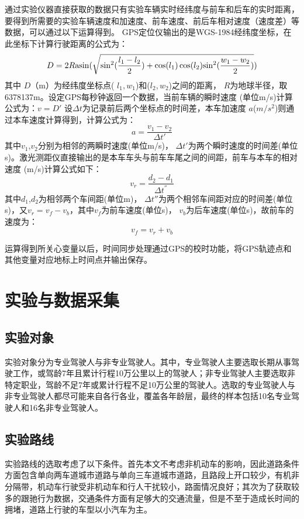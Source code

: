 通过实验仪器直接获取的数据只有实验车辆实时经纬度与前车和后车的实时距离，要得到所需要的实验车辆速度和加速度、前车速度、前后车相对速度（速度差）等数据，可以通过以下运算得到。
GPS定位仪输出的是WGS-1984经纬度坐标，在此坐标下计算行驶距离的公式为：
\begin{equation}
D = 2R{\rm{asin}}(\sqrt {\sin _{}^2(\frac{{{l_1} - {l_2}}}{2}) + \cos ({l_1})\cos ({l_2}){{\sin }^2}(\frac{{{w_1} - {w_2}}}{2})} )
\end{equation}
其中 $D$（m）为经纬度坐标点( ${l_1},{w_1}$)和(${l_2},{w_2}$)之间的距离， $R$为地球半径，取6378137m。设定GPS每秒钟返回一个数据，当前车辆的瞬时速度 (单位m/s)计算公式为：$v = D'$
设$\Delta t$为记录前后两个坐标点的时间差，本车加速度 $a$($m/s^2$)则通过本车速度计算得到，计算公式为：
\begin{equation}
a = \frac{{{v_1} - {v_2}}}{{\Delta t'}}
\end{equation}
其中$v_1$,$v_2$分别为相邻的两瞬时速度(单位m/s)， $\Delta {t'}$为两个瞬时速度的时间差(单位s)。激光测距仪直接输出的是本车车头与前车车尾之间的间距，前车与本车的相对速度 (m/s)计算公式如下：
\begin{equation}
{v_r} = \frac{{{d_2} - {d_1}}}{{\Delta {t^{''}}}}
\end{equation}
其中$d_1$,$d_2$为相邻两个车间距(单位m)， $\Delta t''$为两个相邻车间距对应的时间差(单位s)，又${v_r} = {v_f} - {v_b}$，其中${v_f}$为前车速度(单位s)， ${v_b}$为后车速度(单位s)，故前车的速度为：
\begin{equation}
{v_f} = {v_r} + {v_b}
\end{equation}

运算得到所关心变量以后，时间同步处理通过GPS的校时功能，将GPS轨迹点和其他变量对应地标上时间点并输出保存。

\section{实验与数据采集}
\subsection{实验对象}
实验对象分为专业驾驶人与非专业驾驶人。其中，专业驾驶人主要选取长期从事驾驶工作，或驾龄7年且累计行程10万公里以上的驾驶人；非专业驾驶人主要选取非特定职业，驾龄不足7年或累计行程不足10万公里的驾驶人。选取的专业驾驶人与非专业驾驶人都尽可能来自各行各业，覆盖各年龄层，最终的样本包括10名专业驾驶人和16名非专业驾驶人。
\subsection{实验路线}
实验路线的选取考虑了以下条件。首先本文不考虑非机动车的影响，因此道路条件方面包含单向两车道城市道路与单向三车道城市道路，且路段上开口较少，有机非分隔带，机动车行驶受非机动车和行人干扰较小，路面情况良好；其次为了获取较多的跟驰行为数据，交通条件方面有足够大的交通流量，但是不至于造成长时间的拥堵，道路上行驶的车型以小汽车为主。

